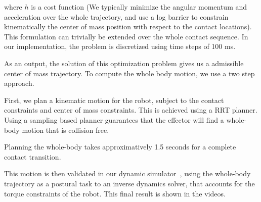 where $h$ is a cost function (We typically minimize the angular momentum and acceleration over the whole trajectory, and use
a log barrier to constrain kinematically the center of mass position with respect to the contact locations).
This formulation can trivially be extended over the whole contact sequence.
In our implementation, the problem is discretized using time steps of 100 ms. 

As an output, the solution of this optimization problem gives us a admissible center of mass trajectory.
To compute the whole body motion, we use a two step approach.

First, we plan a kinematic motion for the robot, subject to the contact constraints and center of mass constraints.
This is achieved using a RRT planner. Using a sampling based planner guarantees that the effector will find a whole-body motion that is collision free.

Planning the whole-body takes approximatively 1.5 seconds for a complete contact transition.

This motion is then validated in our dynamic simulator~\citep{DelPrete2015b}, using the whole-body trajectory as a postural task to an inverse dynamics
solver, that accounts for the torque constraints of the robot. This final result is shown in the videos.
